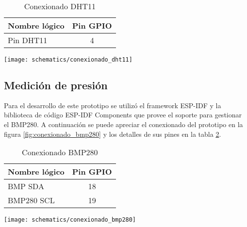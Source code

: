 \vspace{0.5cm}
\begin{table}[h]
\centering
\caption[Conexionado DHT11]{Conexionado DHT11}
\begin{tabular}{l c }
\toprule
\textbf{Nombre lógico} &  \textbf{Pin GPIO}\\
\midrule
 Pin DHT11  & 4  \\
\bottomrule
\hline
\end{tabular}
\label{tab:conexionado_dht11} 
\end{table}
 
\vspace{0.5cm}   
\begin{center}
  \texttt{[image: schematics/conexionado\_dht11]}
    \label{fig:conexionado_dht11}
\end{center}



\subsection{Medición de presión}
Para el desarrollo de este prototipo se utilizó el framework ESP-IDF y la biblioteca de código ESP-IDF Components que provee el soporte para gestionar el BMP280. A continuación se puede apreciar el conexionado del prototipo en la figura \ref{fig:conexionado_bmp280} y los detalles de sus pines en la tabla \ref{tab:conexionado_bmp280}.

\vspace{0.5cm}    
\begin{table}[h]
\centering
\caption[Conexionado BMP280]{Conexionado BMP280}
\begin{tabular}{l c }
\toprule
\textbf{Nombre lógico} &  \textbf{Pin GPIO}\\
\midrule
 BMP SDA & 18 \\
 BMP280 SCL & 19  \\
\bottomrule
\hline
\end{tabular}
\label{tab:conexionado_bmp280} 
\end{table}
    
\vspace{0.5cm}    
\begin{center}
  \texttt{[image: schematics/conexionado\_bmp280]}
    \label{fig:conexionado_bmp280}
\end{center}




